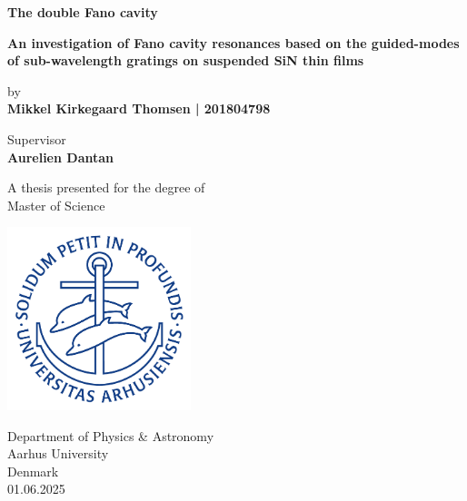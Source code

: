 \begin{titlepage}
    \begin{center}
 
        \Huge{\textbf{The double Fano cavity}}
 
        \large
        \vspace{0.5cm}
        \textbf{An investigation of Fano cavity resonances based on the guided-modes of sub-wavelength gratings on suspended SiN thin films}
 
        \vspace{0.5cm}
        \large
        by\\
        \vspace{0.5cm}
        \textbf{Mikkel Kirkegaard Thomsen | 201804798}
 
        \vspace{0.5cm}
        Supervisor\\
        \textbf{Aurelien Dantan}
 
        \vfill
 
        \large     
        A thesis presented for the degree of\\
        Master of Science
             
        \vspace{0.5cm}
      
        \includegraphics[width=0.4\textwidth]{figures/au_logo.png}
        
        \large     
        Department of Physics \& Astronomy\\
        Aarhus University\\
        Denmark\\
        01.06.2025\\
    \end{center}
 \end{titlepage}